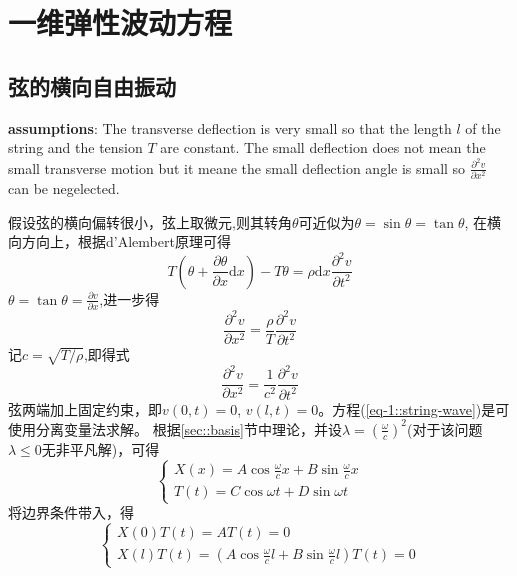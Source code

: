 \section{一维弹性波动方程}
\subsection{弦的横向自由振动}
\textbf{assumptions}: The transverse deflection is very small so that the length $l$ of the string 
and the tension $T$ are constant. The small deflection does not mean the small transverse motion 
but it meane the small deflection angle is small so $\frac{\partial^2 v}{\partial x^2}$ can be negelected.

假设弦的横向偏转很小，弦上取微元,则其转角$\theta$可近似为$\theta=\sin\theta=\tan\theta$,
在横向方向上，根据d'Alembert原理可得
\begin{equation}
    T\left(\theta+\frac{\partial \theta}{\partial x}\mathrm{d}x\right)-T\theta=\rho\mathrm{d}x\frac{\partial^{2}v}{\partial t^{2}}
\end{equation}
$\theta=\tan\theta=\frac{\partial v}{\partial x}$,进一步得
\begin{equation}
    \frac{\partial^{2}v}{\partial x^{2}}=\frac{\rho}{T}\frac{\partial^{2}v}{\partial t^{2}}
\end{equation}
记$c=\sqrt{T/\rho}$,即得式
\begin{equation}\label{eq-1::string-wave}
    \frac{\partial^{2}v}{\partial x^{2}}=\frac{1}{c^{2}}\frac{\partial^{2}v}{\partial t^{2}}
\end{equation}
弦两端加上固定约束，即$v(0,t)=0$, $v(l,t)=0$。方程(\ref{eq-1::string-wave})是可使用分离变量法求解。
根据\ref{sec::basis}节中理论，并设$\lambda=\left(\frac{\omega}{c}\right)^{2}$(对于该问题$\lambda \le 0$无非平凡解)，可得
\begin{equation}
    \left\{ \begin{array}{l}
        X(x) = A\cos \frac{\omega}{c}x + B\sin \frac{\omega}{c}x\\
        T(t) = C\cos \omega t + D\sin \omega t
    \end{array}\right.
\end{equation}
将边界条件带入，得
\begin{equation}
    \left\{ \begin{array}{l}
        X(0)T(t)=AT(t)=0 \\
        X(l)T(t)=\left(A\cos \frac{\omega}{c}l + B\sin \frac{\omega}{c}l\right)T(t)=0
    \end{array}\right.
\end{equation}
